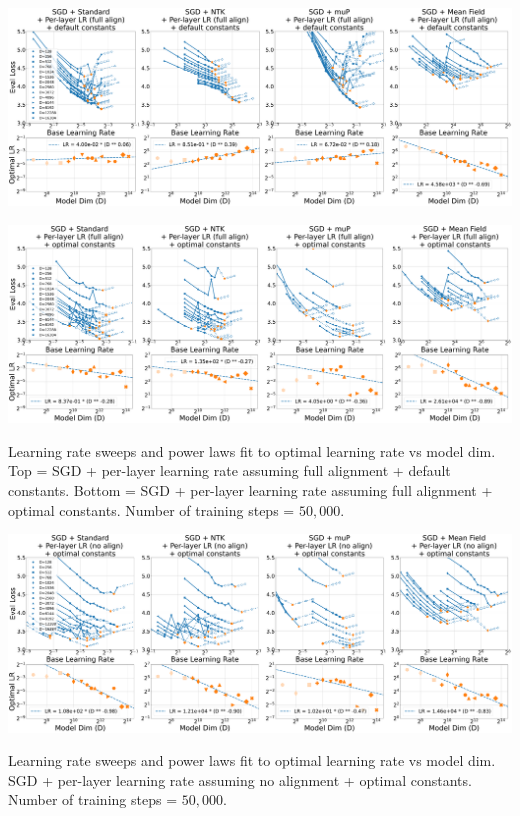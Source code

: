 \thispagestyle{plain}
\begin{SidewaysFigure}
\includegraphics[width=0.98\linewidth]{icml2024/figures/lr_sweeps/appendix/sgd/sgd+50k_steps_per_module_lr.pdf}

\figvspace

\includegraphics[width=0.98\linewidth]{icml2024/figures/lr_sweeps/appendix/sgd/sgd+50k_steps_per_module_lr_optimal_constants.pdf}
\caption{Learning rate sweeps and power laws fit to optimal learning rate vs model dim. Top = SGD + per-layer learning rate assuming full alignment + default constants. Bottom = SGD + per-layer learning rate assuming full alignment + optimal constants. Number of training steps = $50{,}000$.}
\end{SidewaysFigure}
\clearpage

\thispagestyle{plain}
\begin{SidewaysFigure}
\includegraphics[width=0.98\linewidth]{icml2024/figures/lr_sweeps/appendix/sgd/sgd+50k_steps_per_module_lr_optimal_constants_no_align.pdf}
\caption{Learning rate sweeps and power laws fit to optimal learning rate vs model dim. SGD + per-layer learning rate assuming no alignment + optimal constants. Number of training steps = $50{,}000$.}
\end{SidewaysFigure}
\clearpage

